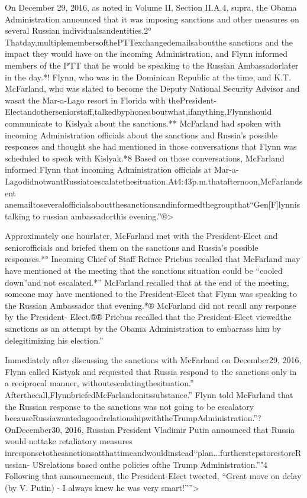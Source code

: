 On December 29, 2016, as noted in Volume II, Section II.A.4, supra, the Obama Administration announced that it was imposing sanctions and other measures on several Russian individualsandentities.2° Thatday,multiplemembersofthePTTexchangedemailsaboutthe sanctions and the impact they would have on the incoming Administration, and Flynn informed members of the PTT that he would be speaking to the Russian Ambassadorlater in the day.*! Flynn, who was in the Dominican Republic at the time, and K.T. McFarland, who was slated to become the Deputy National Security Advisor and wasat the Mar-a-Lago resort in Florida with thePresident-Electandotherseniorstaff,talkedbyphoneaboutwhat,ifanything,Flynnshould communicate to Kislyak about the sanctions.** McFarland had spoken with incoming Administration officials about the sanctions and Russia’s possible responses and thought she had mentioned in those conversations that Flynn was scheduled to speak with Kislyak.*8 Based on those conversations, McFarland informed Flynn that incoming Administration officials at Mar-a- LagodidnotwantRussiatoescalatethesituation.At4:43p.m.thatafternoon,McFarlandsent anemailtoseveralofficialsaboutthesanctionsandinformedthegroupthat“Gen[F]lynnistalking to russian ambassadorthis evening.”®>

Approximately one hourlater, McFarland met with the President-Elect and seniorofficials and briefed them on the sanctions and Russia’s possible responses.*° Incoming Chief of Staff Reince Priebus recalled that McFarland may have mentioned at the meeting that the sanctions situation could be “cooled down”and not escalated.*” McFarland recalled that at the end of the meeting, someone may have mentioned to the President-Elect that Flynn was speaking to the Russian Ambassador that evening.*® McFarland did not recall any response by the President- Elect.®® Priebus recalled that the President-Elect viewedthe sanctions as an attempt by the Obama Administration to embarrass him by delegitimizing his election.”

Immediately after discussing the sanctions with McFarland on December29, 2016, Flynn called Kistyak and requested that Russia respond to the sanctions only in a reciprocal manner, withoutescalatingthesituation.” Afterthecall,FlynnbriefedMcFarlandonitssubstance.” Flynn told McFarland that the Russian response to the sanctions was not going to be escalatory becauseRussiawantedagoodrelationshipwiththeTrumpAdministration.”? OnDecember30, 2016, Russian President Vladimir Putin announced that Russia would nottake retaliatory measures inresponsetothesanctionsatthattimeandwouldinstead“plan...furtherstepstorestoreRussian- USrelations based onthe policies ofthe Trump Administration.”"4 Following that announcement, the President-Elect tweeted, “Great move on delay (by V. Putin) - I always knew he was very smart!””>

